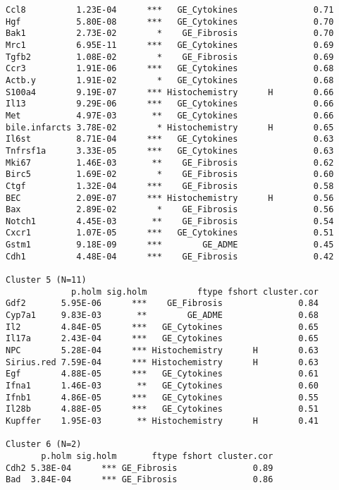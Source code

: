 \documentclass[]{article}
\begin{document}
\begin{verbatim}
Ccl8          1.23E-04      ***   GE_Cytokines               0.71
Hgf           5.80E-08      ***   GE_Cytokines               0.70
Bak1          2.73E-02        *    GE_Fibrosis               0.70
Mrc1          6.95E-11      ***   GE_Cytokines               0.69
Tgfb2         1.08E-02        *    GE_Fibrosis               0.69
Ccr3          1.91E-06      ***   GE_Cytokines               0.68
Actb.y        1.91E-02        *   GE_Cytokines               0.68
S100a4        9.19E-07      *** Histochemistry      H        0.66
Il13          9.29E-06      ***   GE_Cytokines               0.66
Met           4.97E-03       **   GE_Cytokines               0.66
bile.infarcts 3.78E-02        * Histochemistry      H        0.65
Il6st         8.71E-04      ***   GE_Cytokines               0.63
Tnfrsf1a      3.33E-05      ***   GE_Cytokines               0.63
Mki67         1.46E-03       **    GE_Fibrosis               0.62
Birc5         1.69E-02        *    GE_Fibrosis               0.60
Ctgf          1.32E-04      ***    GE_Fibrosis               0.58
BEC           2.09E-07      *** Histochemistry      H        0.56
Bax           2.89E-02        *    GE_Fibrosis               0.56
Notch1        4.45E-03       **    GE_Fibrosis               0.54
Cxcr1         1.07E-05      ***   GE_Cytokines               0.51
Gstm1         9.18E-09      ***        GE_ADME               0.45
Cdh1          4.48E-04      ***    GE_Fibrosis               0.42

Cluster 5 (N=11)
             p.holm sig.holm          ftype fshort cluster.cor
Gdf2       5.95E-06      ***    GE_Fibrosis               0.84
Cyp7a1     9.83E-03       **        GE_ADME               0.68
Il2        4.84E-05      ***   GE_Cytokines               0.65
Il17a      2.43E-04      ***   GE_Cytokines               0.65
NPC        5.28E-04      *** Histochemistry      H        0.63
Sirius.red 7.59E-04      *** Histochemistry      H        0.63
Egf        4.88E-05      ***   GE_Cytokines               0.61
Ifna1      1.46E-03       **   GE_Cytokines               0.60
Ifnb1      4.86E-05      ***   GE_Cytokines               0.55
Il28b      4.88E-05      ***   GE_Cytokines               0.51
Kupffer    1.95E-03       ** Histochemistry      H        0.41

Cluster 6 (N=2)
       p.holm sig.holm       ftype fshort cluster.cor
Cdh2 5.38E-04      *** GE_Fibrosis               0.89
Bad  3.84E-04      *** GE_Fibrosis               0.86
\end{verbatim}

\normalsize
\end{document}
